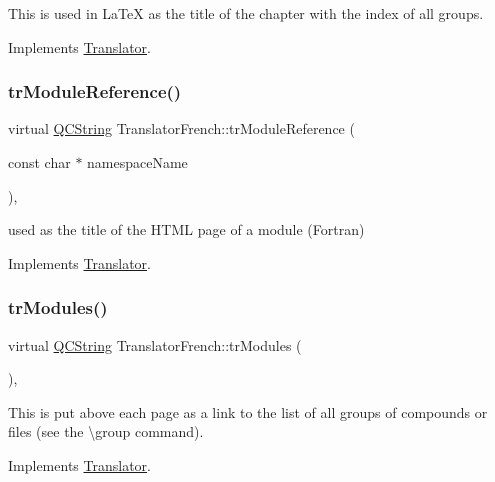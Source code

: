 This is used in La\+TeX as the title of the chapter with the index of all groups. 

Implements \mbox{\hyperlink{class_translator}{Translator}}.

\mbox{\label{class_translator_french_a27ffe0c8a325b9b79a57fe436f63a207}} 
\subsubsection{\texorpdfstring{trModuleReference()}{trModuleReference()}}
{\footnotesize\ttfamily virtual \mbox{\hyperlink{class_q_c_string}{Q\+C\+String}} Translator\+French\+::tr\+Module\+Reference (\begin{DoxyParamCaption}\item[{const char $\ast$}]{namespace\+Name }\end{DoxyParamCaption})\hspace{0.3cm}{\ttfamily [inline]}, {\ttfamily [virtual]}}

used as the title of the H\+T\+ML page of a module (Fortran) 

Implements \mbox{\hyperlink{class_translator}{Translator}}.

\mbox{\label{class_translator_french_a99dbe4074456127ae9a4a05df0f99d3b}} 
\subsubsection{\texorpdfstring{trModules()}{trModules()}}
{\footnotesize\ttfamily virtual \mbox{\hyperlink{class_q_c_string}{Q\+C\+String}} Translator\+French\+::tr\+Modules (\begin{DoxyParamCaption}{ }\end{DoxyParamCaption})\hspace{0.3cm}{\ttfamily [inline]}, {\ttfamily [virtual]}}

This is put above each page as a link to the list of all groups of compounds or files (see the \textbackslash{}group command). 

Implements \mbox{\hyperlink{class_translator}{Translator}}.

